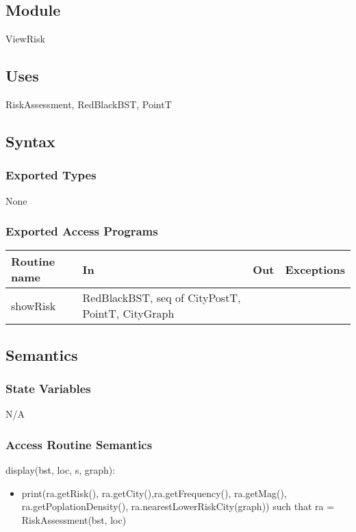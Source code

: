 \documentclass[12pt]{article}
\begin{document}
\subsection* {Module}

ViewRisk

\subsection* {Uses}

RiskAssessment, RedBlackBST, PointT

\subsection* {Syntax}

\subsubsection* {Exported Types}

None

\subsubsection* {Exported Access Programs}

\begin{tabular}{| l | l | l | l |}
\hline
\textbf{Routine name} & \textbf{In} & \textbf{Out} & \textbf{Exceptions}\\
\hline
showRisk & RedBlackBST, seq of CityPostT, PointT, CityGraph & ~ &  ~\\
\hline
\end{tabular}

\subsection* {Semantics}

\subsubsection* {State Variables}

N/A


\subsubsection* {Access Routine Semantics}

\noindent display(bst, loc, s, graph):
\begin{itemize}
\item print(ra.getRisk(), ra.getCity(),ra.getFrequency(), ra.getMag(), ra.getPoplationDensity(), ra.nearestLowerRiskCity(graph)) such that ra = RiskAssessment(bst, loc)\\
\end{itemize}
\end{document}
